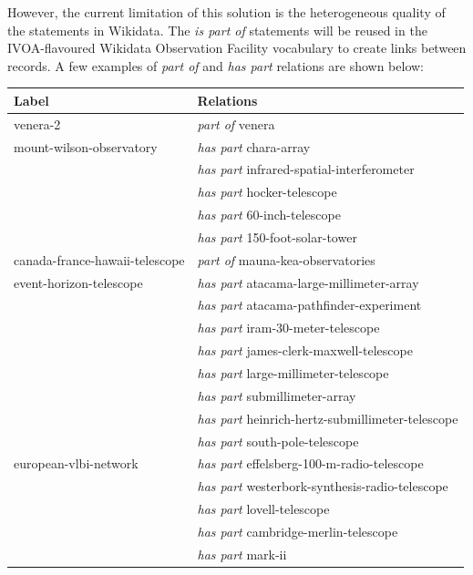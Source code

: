 \documentclass[11pt,a4paper]{ivoa}
\begin{document}
However, the current limitation of this solution is the heterogeneous 
quality of the statements in Wikidata. The \emph{is part of} 
statements will be reused in the IVOA-flavoured Wikidata Observation 
Facility vocabulary to create links between records. A few examples of 
\emph{part of} and \emph{has part} relations are shown below:
{\small \noindent\begin{longtable}{p{}p{}}
\textbf{Label} & \textbf{Relations}\\
\hline
venera-2  & \emph{part of} venera\\
mount-wilson-observatory & \emph{has part} chara-array\\
                         & \emph{has part} infrared-spatial-interferometer\\
                         & \emph{has part} hocker-telescope\\
                         & \emph{has part} 60-inch-telescope\\
                         & \emph{has part} 150-foot-solar-tower\\
canada-france-hawaii-telescope & \emph{part of} mauna-kea-observatories\\
event-horizon-telescope & \emph{has part} atacama-large-millimeter-array\\
                        & \emph{has part} atacama-pathfinder-experiment\\
                        & \emph{has part} iram-30-meter-telescope\\
                        & \emph{has part} james-clerk-maxwell-telescope\\
                        & \emph{has part} large-millimeter-telescope\\
                        & \emph{has part} submillimeter-array\\
                        & \emph{has part} heinrich-hertz-submillimeter-telescope\\
                        & \emph{has part} south-pole-telescope\\
european-vlbi-network   & \emph{has part} effelsberg-100-m-radio-telescope\\
                        & \emph{has part} westerbork-synthesis-radio-telescope\\
                        & \emph{has part} lovell-telescope\\
                        & \emph{has part} cambridge-merlin-telescope\\
                        & \emph{has part} mark-ii\\

\end{longtable}}
\end{document}
